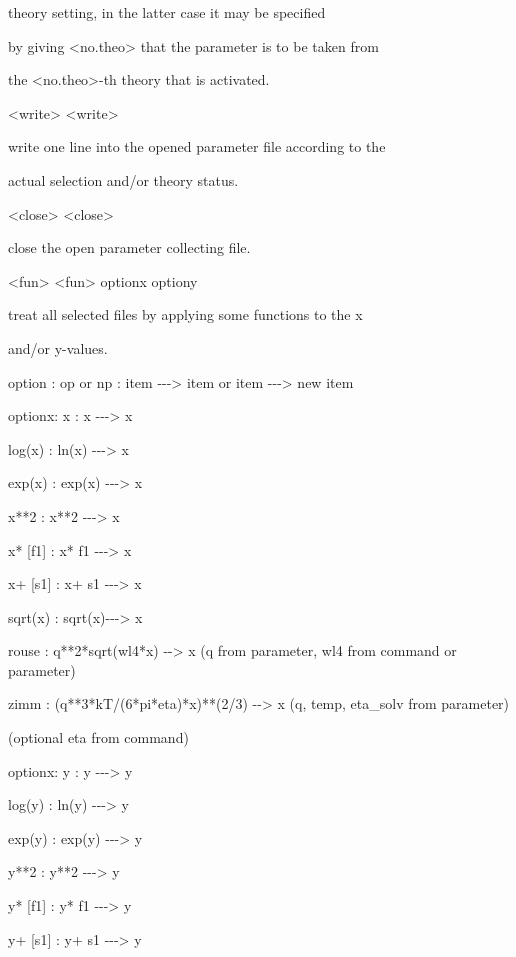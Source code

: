 \documentclass[]{article}
\begin{document}
theory setting, in the latter case it may be specified

by giving \textless{}no.theo\textgreater{} that the parameter is to be
taken from

the \textless{}no.theo\textgreater{}-th theory that is activated.

\textless{}write\textgreater{} \textless{}write\textgreater{}

write one line into the opened parameter file according to the

actual selection and/or theory status.

\textless{}close\textgreater{} \textless{}close\textgreater{}

close the open parameter collecting file.

\textless{}fun\textgreater{} \textless{}fun\textgreater{} optionx
optiony

treat all selected files by applying some functions to the x

and/or y-values.

option : op or np : item -\/-\/-\textgreater{} item or item
-\/-\/-\textgreater{} new item

optionx: x : x -\/-\/-\textgreater{} x

log(x) : ln(x) -\/-\/-\textgreater{} x

exp(x) : exp(x) -\/-\/-\textgreater{} x

x**2 : x**2 -\/-\/-\textgreater{} x

x* {[}f1{]} : x* f1 -\/-\/-\textgreater{} x

x+ {[}s1{]} : x+ s1 -\/-\/-\textgreater{} x

sqrt(x) : sqrt(x)-\/-\/-\textgreater{} x

rouse : q**2*sqrt(wl4*x) -\/-\textgreater{} x (q from parameter, wl4
from command or parameter)

zimm : (q**3*kT/(6*pi*eta)*x)**(2/3) -\/-\textgreater{} x (q, temp,
eta\_solv from parameter)

(optional eta from command)

optionx: y : y -\/-\/-\textgreater{} y

log(y) : ln(y) -\/-\/-\textgreater{} y

exp(y) : exp(y) -\/-\/-\textgreater{} y

y**2 : y**2 -\/-\/-\textgreater{} y

y* {[}f1{]} : y* f1 -\/-\/-\textgreater{} y

y+ {[}s1{]} : y+ s1 -\/-\/-\textgreater{} y
\end{document}
